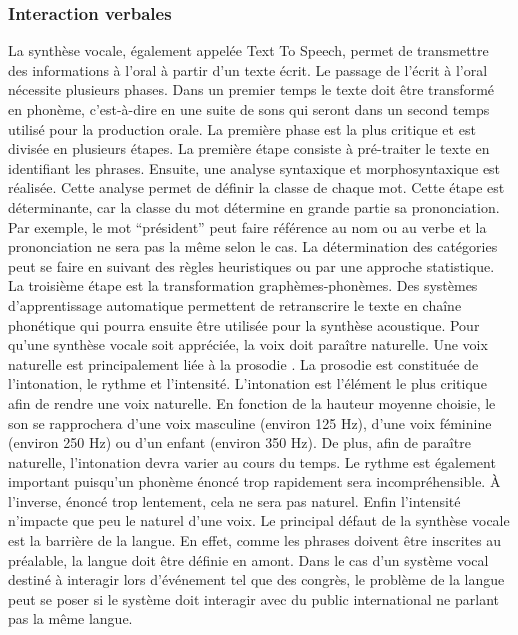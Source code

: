 \subsubsection{Interaction verbales}
La synthèse vocale, également appelée Text To Speech, permet de transmettre des informations à l’oral à partir d’un texte écrit. Le passage de l’écrit à l’oral nécessite plusieurs phases. Dans un premier temps le texte doit être transformé en phonème, c'est-à-dire en une suite de sons qui seront dans un second temps utilisé pour la production orale. La première phase est la plus critique et est divisée en plusieurs étapes. La première étape consiste à pré-traiter le texte en identifiant les phrases. Ensuite, une analyse syntaxique et morphosyntaxique est réalisée. Cette analyse permet de définir la classe de chaque mot. Cette étape est déterminante, car la classe du mot détermine en grande partie sa prononciation. Par exemple, le mot “président” peut faire référence au nom ou au verbe et la prononciation ne sera pas la même selon le cas. La détermination des catégories peut se faire en suivant des règles heuristiques ou par une approche statistique. La troisième étape est la transformation graphèmes-phonèmes. Des systèmes d’apprentissage automatique permettent de retranscrire le texte en chaîne phonétique qui pourra ensuite être utilisée pour la synthèse acoustique.
Pour qu’une synthèse vocale soit appréciée, la voix doit paraître naturelle. Une voix naturelle est principalement liée à la prosodie \cite{dalessandro_synthese_2015}. La prosodie est constituée de l’intonation, le rythme et l’intensité. L’intonation est l’élément le plus critique afin de rendre une voix naturelle. En fonction de la hauteur moyenne choisie, le son se rapprochera d’une voix masculine (environ 125 Hz), d’une voix féminine (environ 250 Hz) ou d’un enfant (environ 350 Hz)\cite{lienard_les_1977}. De plus, afin de paraître naturelle, l’intonation devra varier au cours du temps. Le rythme est également important puisqu'un phonème énoncé trop rapidement sera incompréhensible. À l'inverse, énoncé trop lentement, cela ne sera pas naturel. Enfin l’intensité n’impacte que peu le naturel d’une voix. Le principal défaut de la synthèse vocale est la barrière de la langue. En effet, comme les phrases doivent être inscrites au préalable, la langue doit être définie en amont. Dans le cas d’un système vocal destiné à interagir lors d’événement tel que des congrès, le problème de la langue peut se poser si le système doit interagir avec du public international ne parlant pas la même langue.

